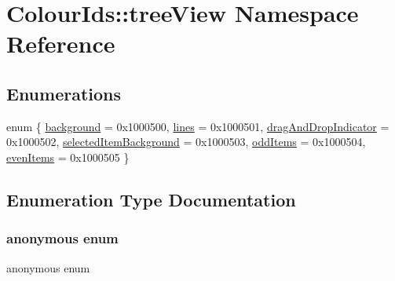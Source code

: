 \hypertarget{namespaceColourIds_1_1treeView}{}\section{Colour\+Ids\+:\+:tree\+View Namespace Reference}
\label{namespaceColourIds_1_1treeView}
\subsection*{Enumerations}
\begin{DoxyCompactItemize}
\item 
enum \{ \newline
\mbox{\hyperlink{namespaceColourIds_1_1treeView_a00cf744a29a05f4bc5b935445c4ce092aef1f6458138da4888c5cc5ce7dcae49e}{background}} = 0x1000500, 
\mbox{\hyperlink{namespaceColourIds_1_1treeView_a00cf744a29a05f4bc5b935445c4ce092a4f8ea32b51f5aba3203c932d5c616820}{lines}} = 0x1000501, 
\mbox{\hyperlink{namespaceColourIds_1_1treeView_a00cf744a29a05f4bc5b935445c4ce092a1192858cc89d9d8cdeb89b4fee06655b}{drag\+And\+Drop\+Indicator}} = 0x1000502, 
\mbox{\hyperlink{namespaceColourIds_1_1treeView_a00cf744a29a05f4bc5b935445c4ce092a5fff73146714046563de60a968d8f2c1}{selected\+Item\+Background}} = 0x1000503, 
\newline
\mbox{\hyperlink{namespaceColourIds_1_1treeView_a00cf744a29a05f4bc5b935445c4ce092aa1d1f2c198a0f1e8397395dfc75d88a6}{odd\+Items}} = 0x1000504, 
\mbox{\hyperlink{namespaceColourIds_1_1treeView_a00cf744a29a05f4bc5b935445c4ce092ab65b2278d570b5e65b2ed6f6589d9b8d}{even\+Items}} = 0x1000505
 \}
\end{DoxyCompactItemize}


\subsection{Enumeration Type Documentation}
\mbox{\label{namespaceColourIds_1_1treeView_a00cf744a29a05f4bc5b935445c4ce092}} 
\subsubsection{\texorpdfstring{anonymous enum}{anonymous enum}}
{\footnotesize\ttfamily anonymous enum}


